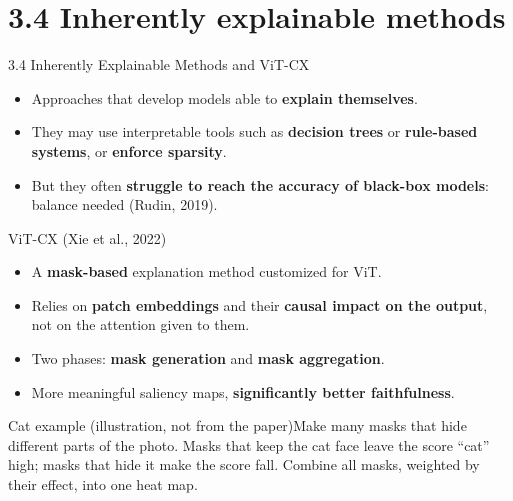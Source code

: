 \documentclass[10pt]{beamer}
\newcommand{\highlight}[1]{\textcolor{myNewColorA}{\textbf{#1}}}
\newcommand{\catex}[1]{\begin{exampleblock}{\footnotesize Cat example (illustration, not from the paper)}\footnotesize #1\end{exampleblock}}
\begin{document}
\section{3.4 Inherently explainable methods}

\begin{frame}{3.4 Inherently Explainable Methods and ViT-CX}
\begin{itemize}\small
  \item Approaches that develop models able to \highlight{explain themselves}.
  \item They may use interpretable tools such as \textbf{decision trees} or \textbf{rule-based systems}, or \textbf{enforce sparsity}.
  \item But they often \textbf{struggle to reach the accuracy of black-box models}: balance needed (Rudin, 2019).
\end{itemize}
\begin{block}{ViT-CX (Xie et al., 2022)}
\begin{itemize}\small
\item A \textbf{mask-based} explanation method customized for ViT.
\item Relies on \textbf{patch embeddings} and their \textbf{causal impact on the output}, not on the attention given to them.
\item Two phases: \textbf{mask generation} and \textbf{mask aggregation}.
\item More meaningful saliency maps, \textbf{significantly better faithfulness}.
\end{itemize}
\end{block}
\catex{Make many masks that hide different parts of the photo. Masks that keep the cat face leave the score ``cat'' high; masks that hide it make the score fall. Combine all masks, weighted by their effect, into one heat map.}
\end{frame}
\end{document}

